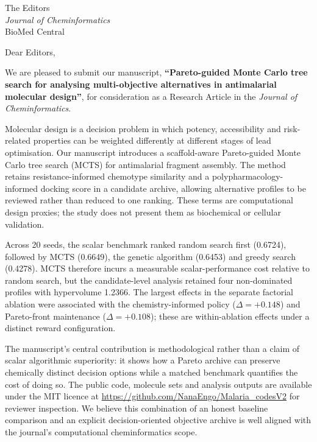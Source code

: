 \documentclass[10pt,a4paper]{letter}
\begin{document}
\begin{letter}{%
  The Editors \\
  \textit{Journal of Cheminformatics} \\
  BioMed Central
}

\opening{Dear Editors,}
\small
\setlength{\parskip}{0.35em}

We are pleased to submit our manuscript, \textbf{``Pareto-guided Monte Carlo tree search for analysing multi-objective alternatives in antimalarial molecular design''}, for consideration as a Research Article in the \textit{Journal of Cheminformatics}.

Molecular design is a decision problem in which potency, accessibility and risk-related properties can be weighted differently at different stages of lead optimisation. Our manuscript introduces a scaffold-aware Pareto-guided Monte Carlo tree search (MCTS) for antimalarial fragment assembly. The method retains resistance-informed chemotype similarity and a polypharmacology-informed docking score in a candidate archive, allowing alternative profiles to be reviewed rather than reduced to one ranking. These terms are computational design proxies; the study does not present them as biochemical or cellular validation.

Across \num{20} seeds, the scalar benchmark ranked random search first (\num{0.6724}), followed by MCTS (\num{0.6649}), the genetic algorithm (\num{0.6453}) and greedy search (\num{0.4278}). MCTS therefore incurs a measurable scalar-performance cost relative to random search, but the candidate-level analysis retained four non-dominated profiles with hypervolume \num{1.2366}. The largest effects in the separate factorial ablation were associated with the chemistry-informed policy ($\Delta=+\num{0.148}$) and Pareto-front maintenance ($\Delta=+\num{0.108}$); these are within-ablation effects under a distinct reward configuration.

The manuscript's central contribution is methodological rather than a claim of scalar algorithmic superiority: it shows how a Pareto archive can preserve chemically distinct decision options while a matched benchmark quantifies the cost of doing so. The public code, molecule sets and analysis outputs are available under the MIT licence at \url{https://github.com/NanaEngo/Malaria_codesV2} for reviewer inspection. We believe this combination of an honest baseline comparison and an explicit decision-oriented objective archive is well aligned with the journal's computational cheminformatics scope.


\end{letter}
\end{document}
